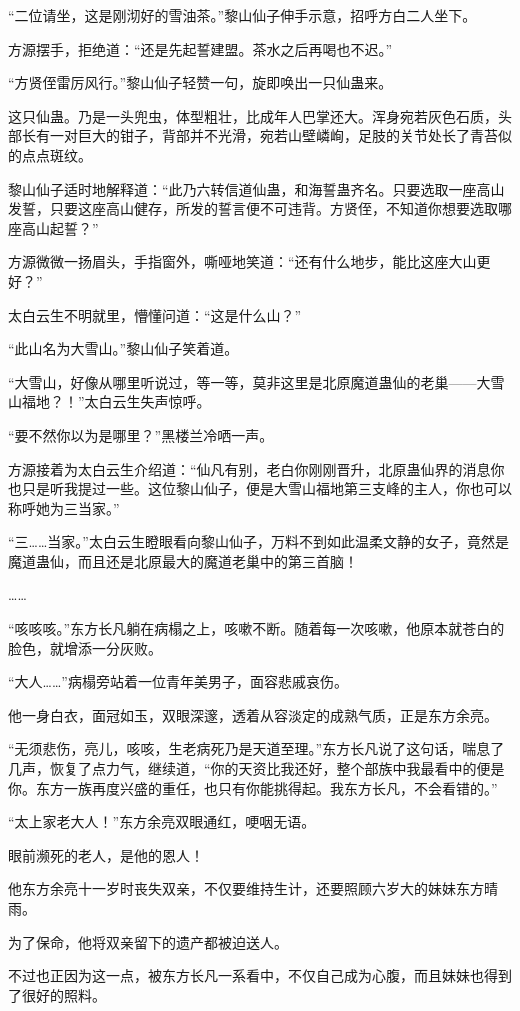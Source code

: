 \begin{this_body}
“二位请坐，这是刚沏好的雪油茶。”黎山仙子伸手示意，招呼方白二人坐下。

方源摆手，拒绝道：“还是先起誓建盟。茶水之后再喝也不迟。”

“方贤侄雷厉风行。”黎山仙子轻赞一句，旋即唤出一只仙蛊来。

这只仙蛊。乃是一头兜虫，体型粗壮，比成年人巴掌还大。浑身宛若灰色石质，头部长有一对巨大的钳子，背部并不光滑，宛若山壁嶙峋，足肢的关节处长了青苔似的点点斑纹。

黎山仙子适时地解释道：“此乃六转信道仙蛊，和海誓蛊齐名。只要选取一座高山发誓，只要这座高山健存，所发的誓言便不可违背。方贤侄，不知道你想要选取哪座高山起誓？”

方源微微一扬眉头，手指窗外，嘶哑地笑道：“还有什么地步，能比这座大山更好？”

太白云生不明就里，懵懂问道：“这是什么山？”

“此山名为大雪山。”黎山仙子笑着道。

“大雪山，好像从哪里听说过，等一等，莫非这里是北原魔道蛊仙的老巢——大雪山福地？！”太白云生失声惊呼。

“要不然你以为是哪里？”黑楼兰冷哂一声。

方源接着为太白云生介绍道：“仙凡有别，老白你刚刚晋升，北原蛊仙界的消息你也只是听我提过一些。这位黎山仙子，便是大雪山福地第三支峰的主人，你也可以称呼她为三当家。”

“三……当家。”太白云生瞪眼看向黎山仙子，万料不到如此温柔文静的女子，竟然是魔道蛊仙，而且还是北原最大的魔道老巢中的第三首脑！

……

“咳咳咳。”东方长凡躺在病榻之上，咳嗽不断。随着每一次咳嗽，他原本就苍白的脸色，就增添一分灰败。

“大人……”病榻旁站着一位青年美男子，面容悲戚哀伤。

他一身白衣，面冠如玉，双眼深邃，透着从容淡定的成熟气质，正是东方余亮。

“无须悲伤，亮儿，咳咳，生老病死乃是天道至理。”东方长凡说了这句话，喘息了几声，恢复了点力气，继续道，“你的天资比我还好，整个部族中我最看中的便是你。东方一族再度兴盛的重任，也只有你能挑得起。我东方长凡，不会看错的。”

“太上家老大人！”东方余亮双眼通红，哽咽无语。

眼前濒死的老人，是他的恩人！

他东方余亮十一岁时丧失双亲，不仅要维持生计，还要照顾六岁大的妹妹东方晴雨。

为了保命，他将双亲留下的遗产都被迫送人。

不过也正因为这一点，被东方长凡一系看中，不仅自己成为心腹，而且妹妹也得到了很好的照料。


\end{this_body}
